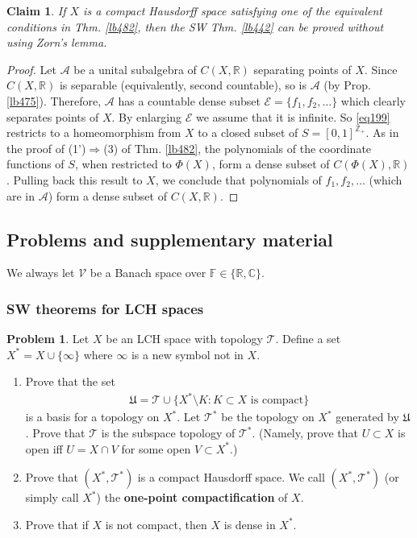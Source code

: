 \documentclass[12pt,b5paper,notitlepage]{article}
\theoremstyle{definition}
\newtheorem{prob}{\color{red}Problem}[section]
\theoremstyle{plain}
\newtheorem{claim}[df]{Claim}
\newcommand{\fk}{\mathfrak}
\newcommand{\mc}{\mathcal}
\newcommand{\scr}{\mathscr}
\newcommand{\Cbb}{\mathbb C}
\newcommand{\Zbb}{\mathbb Z}
\newcommand{\Rbb}{\mathbb R}
\newcommand{\Fbb}{\mathbb F}
\numberwithin{equation}{section}
\begin{document}
\begin{claim}
If $X$ is a compact Hausdorff space satisfying one of the equivalent conditions in Thm. \ref{lb482}, then the SW Thm. \ref{lb442} can be proved without using Zorn's lemma.
\end{claim}


\begin{proof}
Let $\scr A$ be a unital subalgebra of $C(X,\Rbb)$ separating points of $X$. Since $C(X,\Rbb)$ is separable (equivalently, second countable), so is $\scr A$ (by Prop. \ref{lb475}). Therefore, $\scr A$ has a countable dense subset $\mc E=\{f_1,f_2,\dots\}$ which clearly separates points of $X$. By enlarging $\mc E$ we assume that it is infinite. So \eqref{eq199} restricts to a homeomorphism from $X$ to a closed subset of $S=[0,1]^{\Zbb_+}$. As in the proof of (1')$\Rightarrow$(3) of Thm. \ref{lb482}, the polynomials of the coordinate functions of $S$, when restricted to $\Phi(X)$, form a dense subset of $C(\Phi(X),\Rbb)$. Pulling back this result to $X$, we conclude that polynomials of $f_1,f_2,\dots$ (which are in $\scr A$) form a dense subset of $C(X,\Rbb)$.
\end{proof}



\subsection{Problems and supplementary material}


We always let $\mc V$ be a Banach space over $\Fbb\in\{\Rbb,\Cbb\}$.

\subsubsection{SW theorems for LCH spaces}

\begin{prob}\label{lb431}
Let $X$ be an LCH space with topology $\mc T$. Define a set $X^*=X\cup\{\infty\}$ where $\infty$ is a new symbol not in $X$. 
\begin{enumerate}
\item Prove that the set
\begin{align*}
\fk U=\mc T\cup\{X^*\setminus K:K\subset X\text{ is compact}\}
\end{align*}
is a basis for a topology on $X^*$. Let $\mc T^*$ be the topology on $X^*$ generated by $\fk U$. Prove that $\mc T$ is the subspace topology of $\mc T^*$. (Namely, prove that $U\subset X$ is open iff $U=X\cap V$ for some open $V\subset X^*$.)
\item Prove that $(X^*,\mc T^*)$ is a compact Hausdorff space. We call $(X^*,\mc T^*)$ (or simply call $X^*$) the \textbf{one-point compactification}  of $X$.
\item Prove that if $X$ is not compact, then $X$ is dense in $X^*$.
\end{enumerate}
\end{prob}
\end{document}
